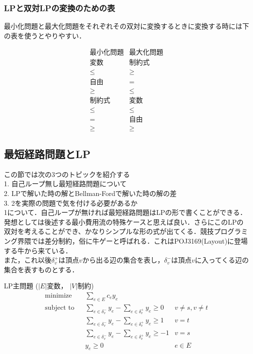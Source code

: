 \documentclass[13pt, a4paper, landscape]{jarticle}
\theoremstyle{nonitalic} %
\begin{document}
\subsubsection{LPと双対LPの変換のための表}

最小化問題と最大化問題をそれぞれその双対に変換するときに変換する時には下の表を使うとやりやすい．

\begin{equation*}
\begin{array}{c|c}
  \textrm{最小化問題} &  \textrm{最大化問題} \\ \hline \hline
  \textrm{変数} &  \textrm{制約式} \\ \hline
  \leq & \geq \\
  \textrm{自由} & = \\
  \geq & \leq \\ \hline \hline
  \textrm{制約式} & \textrm{変数} \\ \hline
  \leq & \leq \\
   =   & \textrm{自由} \\
  \geq & \geq
\end{array}
\end{equation*}


\subsection{最短経路問題とLP}

この節では次の3つのトピックを紹介する \\
1. 自己ループ無し最短経路問題について \\
2. LPで解いた時の解とBellman-Fordで解いた時の解の差\\
3. 2を実際の問題で気を付ける必要があるか
\\

 1について．自己ループが無ければ最短経路問題はLPの形で書くことができる．発想としては後述する最小費用流の特殊ケースと思えば良い．さらにこのLPの双対を考えることができ、かなりシンプルな形の式が出てくる．競技プログラミング界隈では差分制約，俗に牛ゲーと呼ばれる．これはPOJ3169(Layout)に登場する牛から来ている． \\

また，これ以後$\delta_{v}^+$は頂点$v$から出る辺の集合を表し，$\delta_{v}^-$は頂点$v$に入ってくる辺の集合を表すものとする．

LP主問題
($|E|$変数， $|V|$制約)
\begin{align}
 &&&&&\textrm{minimize}   && \sum_{e  \in E} c_e y_e \\
 &&&&&\textrm{subject to} && \sum_{e \in \delta_v^- } y_e - \sum_{e \in \delta_v^+} y_e \geq 0 & v\neq s, v\neq t  &&&&&\\
 &&&&&                    && \sum_{e \in \delta_v^- } y_e - \sum_{e \in \delta_v^+} y_e \geq 1 & v = t  &&&&&\\
 &&&&&                    && \sum_{e \in \delta_v^- } y_e - \sum_{e \in \delta_v^+} y_e \geq -1 & v = s  &&&&&\\
 &&&&&                    &&  y_e \geq 0 & e \in E&&&&&
\end{align}
\end{document}
